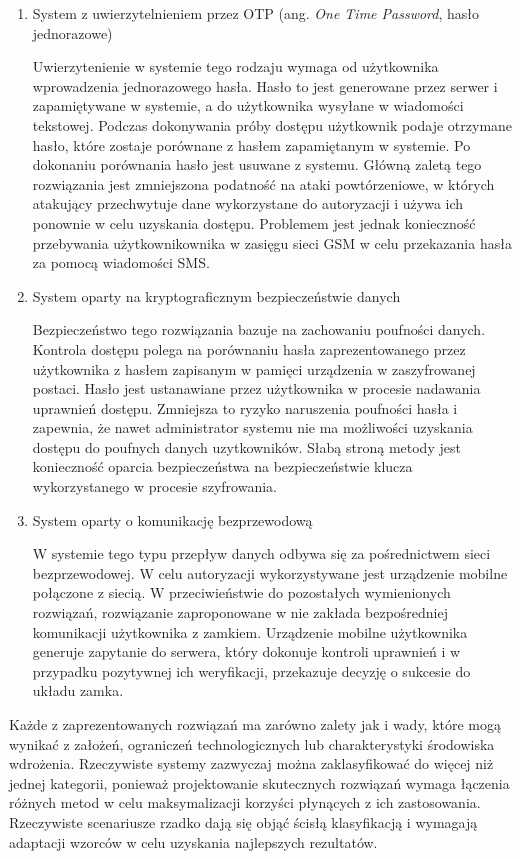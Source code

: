 \begin{enumerate}[label=\Alph*.]
			\item System z uwierzytelnieniem przez OTP (ang. \textit{One Time Password}, hasło jednorazowe)

				Uwierzytenienie w systemie tego rodzaju wymaga od użytkownika wprowadzenia jednorazowego hasła. Hasło to jest generowane przez serwer i zapamiętywane w systemie, a do użytkownika wysyłane w wiadomości tekstowej. Podczas dokonywania próby dostępu użytkownik podaje otrzymane hasło, które zostaje porównane z hasłem zapamiętanym w systemie. Po dokonaniu porównania hasło jest usuwane z systemu. Główną zaletą tego rozwiązania jest zmniejszona podatność na ataki powtórzeniowe, w których atakujący przechwytuje dane wykorzystane do autoryzacji i używa ich ponownie w celu uzyskania dostępu. Problemem jest jednak konieczność przebywania użytkownikownika w zasięgu sieci GSM w celu przekazania hasła za pomocą wiadomości SMS.

			\item System oparty na kryptograficznym bezpieczeństwie danych

				Bezpieczeństwo tego rozwiązania bazuje na zachowaniu poufności danych. Kontrola dostępu polega na porównaniu hasła zaprezentowanego przez użytkownika z hasłem zapisanym w pamięci urządzenia w zaszyfrowanej postaci. Hasło jest ustanawiane przez użytkownika w procesie nadawania uprawnień dostępu. Zmniejsza to ryzyko naruszenia poufności hasła i zapewnia, że nawet administrator systemu nie ma możliwości uzyskania dostępu do poufnych danych uzytkowników. Słabą stroną metody jest konieczność oparcia bezpieczeństwa na bezpieczeństwie klucza wykorzystanego w procesie szyfrowania.

			\item System oparty o komunikację bezprzewodową

				W systemie tego typu przepływ danych odbywa się za pośrednictwem sieci bezprzewodowej. W celu autoryzacji wykorzystywane jest urządzenie mobilne połączone z siecią. W przeciwieństwie do pozostałych wymienionych rozwiązań, rozwiązanie zaproponowane w \cite{cryptographic-iot-access-system} nie zakłada bezpośredniej komunikacji użytkownika z zamkiem. Urządzenie mobilne użytkownika generuje zapytanie do serwera, który dokonuje kontroli uprawnień i w przypadku pozytywnej ich weryfikacji, przekazuje decyzję o sukcesie do układu zamka.


		\end{enumerate}

		Każde z zaprezentowanych rozwiązań ma zarówno zalety jak i wady, które mogą wynikać z założeń, ograniczeń technologicznych lub charakterystyki środowiska wdrożenia. Rzeczywiste systemy zazwyczaj można zaklasyfikować do więcej niż jednej kategorii, ponieważ projektowanie skutecznych rozwiązań wymaga łączenia różnych metod w celu maksymalizacji korzyści płynących z ich zastosowania. Rzeczywiste scenariusze rzadko dają się objąć ścisłą klasyfikacją i wymagają adaptacji wzorców w celu uzyskania najlepszych rezultatów.

